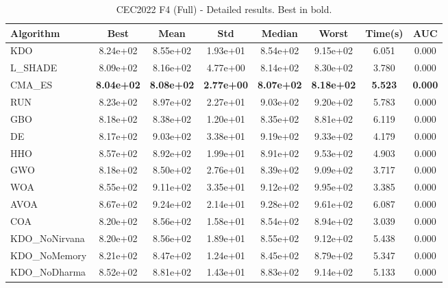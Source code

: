 \begin{table}[H]
\centering\small
\caption{CEC2022 F4 (Full) - Detailed results. Best in bold.}
\label{tab:cec2022_F4}
\begin{tabular}{lccccccc}
\toprule
\textbf{Algorithm} & \textbf{Best} & \textbf{Mean} & \textbf{Std} & \textbf{Median} & \textbf{Worst} & \textbf{Time(s)} & \textbf{AUC} \\
\midrule
KDO & 8.24e+02 & 8.55e+02 & 1.93e+01 & 8.54e+02 & 9.15e+02 & 6.051 & 0.000 \\
L_SHADE & 8.09e+02 & 8.16e+02 & 4.77e+00 & 8.14e+02 & 8.30e+02 & 3.780 & 0.000 \\
CMA_ES & \textbf{8.04e+02} & \textbf{8.08e+02} & \textbf{2.77e+00} & \textbf{8.07e+02} & \textbf{8.18e+02} & \textbf{5.523} & \textbf{0.000} \\
RUN & 8.23e+02 & 8.97e+02 & 2.27e+01 & 9.03e+02 & 9.20e+02 & 5.783 & 0.000 \\
GBO & 8.18e+02 & 8.38e+02 & 1.20e+01 & 8.35e+02 & 8.81e+02 & 6.119 & 0.000 \\
DE & 8.17e+02 & 9.03e+02 & 3.38e+01 & 9.19e+02 & 9.33e+02 & 4.179 & 0.000 \\
HHO & 8.57e+02 & 8.92e+02 & 1.99e+01 & 8.91e+02 & 9.53e+02 & 4.903 & 0.000 \\
GWO & 8.18e+02 & 8.50e+02 & 2.76e+01 & 8.39e+02 & 9.09e+02 & 3.717 & 0.000 \\
WOA & 8.55e+02 & 9.11e+02 & 3.35e+01 & 9.12e+02 & 9.95e+02 & 3.385 & 0.000 \\
AVOA & 8.67e+02 & 9.24e+02 & 2.14e+01 & 9.28e+02 & 9.61e+02 & 6.087 & 0.000 \\
COA & 8.20e+02 & 8.56e+02 & 1.58e+01 & 8.54e+02 & 8.94e+02 & 3.039 & 0.000 \\
KDO_NoNirvana & 8.20e+02 & 8.56e+02 & 1.89e+01 & 8.55e+02 & 9.12e+02 & 5.438 & 0.000 \\
KDO_NoMemory & 8.21e+02 & 8.47e+02 & 1.24e+01 & 8.45e+02 & 8.79e+02 & 5.347 & 0.000 \\
KDO_NoDharma & 8.52e+02 & 8.81e+02 & 1.43e+01 & 8.83e+02 & 9.14e+02 & 5.133 & 0.000 \\
\bottomrule
\end{tabular}
\end{table}
